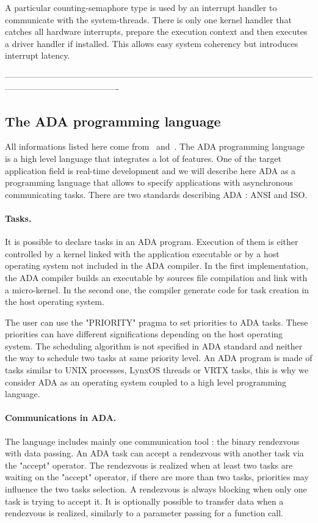 \documentclass[10pt]{report}
\begin{document}
A particular counting-semaphore type is used by an interrupt handler to communicate with the system-threads. There is only one
kernel handler that catches all hardware interrupts, prepare the execution context and then executes a driver handler if installed.
This allows easy system coherency but introduces interrupt latency.

----------------------------------------------------------------------------------------------------------------------------------------------------

\subsection{The ADA programming language}

All informations listed here come from~\cite{Booch:86} and~\cite{ADA:83}. The ADA programming language is a high level language
that integrates a lot of features. One of the target application field is real-time development and we will describe here ADA
as a programming language that allows to specify applications with asynchronous communicating tasks. There are two standards
describing ADA : ANSI and ISO.

\paragraph{Tasks.} It is possible to declare tasks in an ADA program. Execution of them is either controlled by a kernel linked
with the application executable or by a host operating system not included in the ADA compiler. In the first implementation,
the ADA compiler builds an executable by sources file compilation and link with a micro-kernel. In the second one, the compiler
generate code for task creation in the host operating system.

The user can use the "PRIORITY" pragma to set priorities to ADA tasks. These priorities can have different significations
depending on the host operating system. The scheduling algorithm is not specified in ADA standard and neither the way to schedule
two tasks at same priority level. An ADA program is made of tasks similar to UNIX processes, LynxOS threads or VRTX tasks, this
is why we consider ADA as an operating system coupled to a high level programming language.

\paragraph{Communications in ADA.} The language includes mainly one communication tool : the binary rendezvous with data passing.
An ADA task can accept a rendezvous with another task via the "accept" operator. The rendezvous is realized when at least two
tasks are waiting on the "accept" operator, if there are more than two tasks, priorities may influence the two tasks selection.
A rendezvous is always blocking when only one task is trying to accept it. It is optionally possible to transfer data when a
rendezvous is realized, similarly to a parameter passing for a function call.
\end{document}
